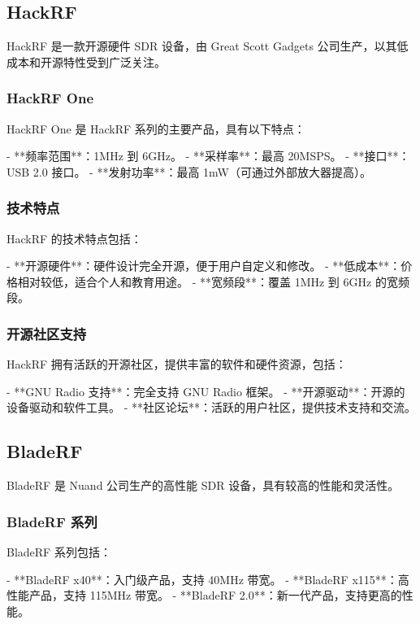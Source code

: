 \documentclass[UTF8]{ctexbook}
\begin{document}
\subsection{HackRF}

HackRF 是一款开源硬件 SDR 设备，由 Great Scott Gadgets 公司生产，以其低成本和开源特性受到广泛关注。

\subsubsection{HackRF One}

HackRF One 是 HackRF 系列的主要产品，具有以下特点：

- **频率范围**：1MHz 到 6GHz。
- **采样率**：最高 20MSPS。
- **接口**：USB 2.0 接口。
- **发射功率**：最高 1mW（可通过外部放大器提高）。

\subsubsection{技术特点}

HackRF 的技术特点包括：

- **开源硬件**：硬件设计完全开源，便于用户自定义和修改。
- **低成本**：价格相对较低，适合个人和教育用途。
- **宽频段**：覆盖 1MHz 到 6GHz 的宽频段。

\subsubsection{开源社区支持}

HackRF 拥有活跃的开源社区，提供丰富的软件和硬件资源，包括：

- **GNU Radio 支持**：完全支持 GNU Radio 框架。
- **开源驱动**：开源的设备驱动和软件工具。
- **社区论坛**：活跃的用户社区，提供技术支持和交流。

\subsection{BladeRF}

BladeRF 是 Nuand 公司生产的高性能 SDR 设备，具有较高的性能和灵活性。

\subsubsection{BladeRF 系列}

BladeRF 系列包括：

- **BladeRF x40**：入门级产品，支持 40MHz 带宽。
- **BladeRF x115**：高性能产品，支持 115MHz 带宽。
- **BladeRF 2.0**：新一代产品，支持更高的性能。
\end{document}
